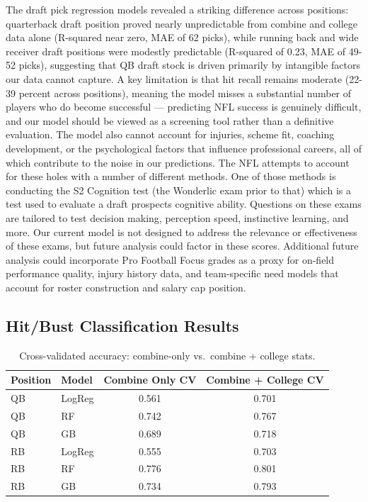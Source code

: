 \documentclass[11pt]{article}
\begin{document}
The draft pick regression models revealed a striking difference across positions: quarterback draft position proved nearly unpredictable from combine and college data alone (R-squared near zero, MAE of 62 picks), while running back and wide receiver draft positions were modestly predictable (R-squared of 0.23, MAE of 49-52 picks), suggesting that QB draft stock is driven primarily by intangible factors our data cannot capture. A key limitation is that hit recall remains moderate (22-39 percent across positions), meaning the model misses a substantial number of players who do become successful — predicting NFL success is genuinely difficult, and our model should be viewed as a screening tool rather than a definitive evaluation. The model also cannot account for injuries, scheme fit, coaching development, or the psychological factors that influence professional careers, all of which contribute to the noise in our predictions. The NFL attempts to account for these holes with a number of different methods. One of those methods is conducting the S2 Cognition test (the Wonderlic exam prior to that) which is a test used to evaluate a draft prospects cognitive ability. Questions on these exams are tailored to test decision making, perception speed, instinctive learning, and more. Our current model is not designed to address the relevance or effectiveness of these exams, but future analysis could factor in these scores. Additional future analysis could incorporate Pro Football Focus grades as a proxy for on-field performance quality, injury history data, and team-specific need models that account for roster construction and salary cap position.


\subsection{Hit/Bust Classification Results}


\begin{table}[H]
  \centering
  \begin{tabular}{llcc}
    \toprule
    Position & Model & Combine Only CV & Combine + College CV \\
    \midrule
    QB & LogReg & 0.561 & 0.701 \\
    QB & RF & 0.742 & 0.767 \\
    QB & GB & 0.689 & 0.718 \\
    \midrule
    RB & LogReg & 0.555 & 0.703 \\
    RB & RF & 0.776 & 0.801 \\
    RB & GB & 0.734 & 0.793 \\
    \bottomrule
  \end{tabular}
  \caption{Cross-validated accuracy: combine-only vs.\ combine + college stats.}
  \label{tab:cv_comparison}
\end{table}
\end{document}
